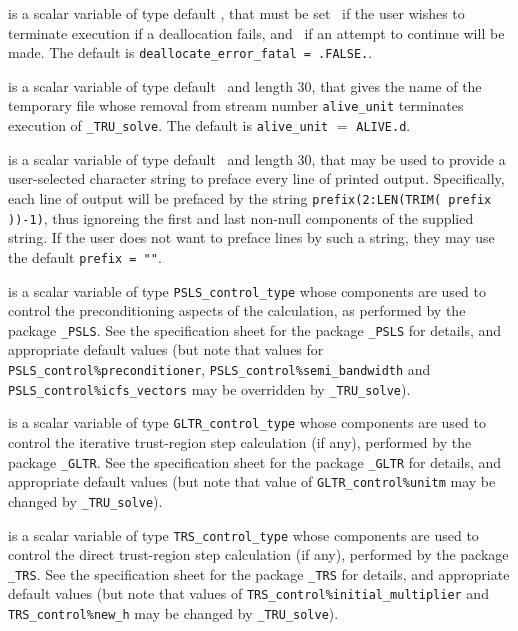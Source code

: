 \documentclass{galahad}
\newcommand{\packagename}{TRU}
\newcommand{\fullpackagename}{\libraryname\_\packagename}
\newcommand{\solver}{{\tt \fullpackagename\_solve}}
\begin{document}
\begin{description}
 is a scalar variable of type default \logical,
that must be set \true\ if the user wishes to terminate execution if
a deallocation  fails, and \false\ if an attempt to continue
will be made. The default is {\tt deallocate\_error\_fatal = .FALSE.}.

 is a scalar variable of type default \character\ and length
30, that gives the name of the temporary file whose removal from stream number
{\tt alive\_unit} terminates execution of \solver.
The default is {\tt alive\_unit} $=$ {\tt ALIVE.d}.

 is a scalar variable of type default \character\
and length 30, that may be used to provide a user-selected
character string to preface every line of printed output.
Specifically, each line of output will be prefaced by the string
{\tt prefix(2:LEN(TRIM( prefix ))-1)},
thus ignoreing the first and last non-null components of the
supplied string. If the user does not want to preface lines by such
a string, they may use the default {\tt prefix = ""}.

 is a scalar variable of type
{\tt PSLS\_control\_type}
whose components are used to control the preconditioning
aspects of the calculation, as performed by the package
{\tt \libraryname\_PSLS}.
See the specification sheet for the package
{\tt \libraryname\_PSLS}
for details, and appropriate default values (but note that values for
{\tt PSLS\_control\%preconditioner},
{\tt PSLS\_control\%semi\_bandwidth} and
{\tt PSLS\_control\%icfs\_vectors}
may be overridden by \solver).

 is a scalar variable of type
{\tt GLTR\_control\_type}
whose components are used to control the
iterative trust-region step calculation (if any),
performed by the package
{\tt \libraryname\_GLTR}.
See the specification sheet for the package
{\tt \libraryname\_GLTR}
for details, and appropriate default values
(but note that value of
{\tt GLTR\_control\%unitm}
may be changed by \solver).

 is a scalar variable of type
{\tt TRS\_control\_type}
whose components are used to control the
direct trust-region step calculation (if any),
performed by the package
{\tt \libraryname\_TRS}.
See the specification sheet for the package
{\tt \libraryname\_TRS}
for details, and appropriate default values
(but note that values of
{\tt TRS\_control\%initial\_multiplier}
and
{\tt TRS\_control\%new\_h}
may be changed by \solver).


\end{description}
\end{document}
